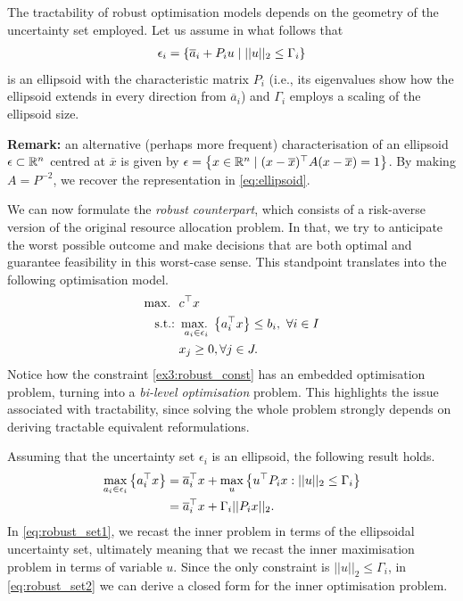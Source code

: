 The tractability of robust optimisation models depends on the geometry of the uncertainty set employed. Let us assume in what follows that 
%
\begin{align}
	\epsilon_i = \left\{ \overline{a}_i + P_iu \mid ||u||_2 \leq \Gamma_i \right \} \label{eq:ellipsoid}
\end{align}
%
is an ellipsoid with the characteristic matrix $P_i$ (i.e., its eigenvalues show how the ellipsoid extends in every direction from $\overline{a}_i$) and $\Gamma_i$ employs a scaling of the ellipsoid size.

{\bf Remark:} an alternative (perhaps more frequent) characterisation of an ellipsoid $\epsilon \subset \mathbb{R}^n$ centred at $\overline{x}$ is given by $\epsilon = \left\{ x \in \mathbb{R}^n \mid (x - \overline{x})^\top A(x - \overline{x}) = 1 \right \}$. By making $A = P^{-2}$, we recover the representation in \eqref{eq:ellipsoid}.

We can now formulate the \emph{robust counterpart}, which consists of a risk-averse version of the original resource allocation problem. In that, we try to anticipate the worst possible outcome and make decisions that are both optimal and guarantee feasibility in this worst-case sense. This standpoint translates into the following optimisation model.
%
\begin{align}
	\mathop{\text{max.~}} \ &  c^\top x \nonumber \\
	\mathop{\text{s.t.:~}} & \mathop{\text{max.~}}_{a_{i} \in \epsilon_i}\left\{ a_i^\top x \right \} \leq b_i, \ \forall i \in I \label{ex3:robust_const}\\
	& x_j \geq 0, \forall j \in J. \nonumber
\end{align}
%
Notice how the constraint \eqref{ex3:robust_const} has an embedded optimisation problem, turning into a \emph{bi-level optimisation} problem. This highlights the issue associated with tractability, since solving the whole problem strongly depends on deriving tractable equivalent reformulations.

Assuming that the uncertainty set $\epsilon_i$ is an ellipsoid, the following result holds.
%
\begin{align}
	\max_{a_{i} \in \epsilon_i}\left\{ a_i^\top x \right \}  & = \overline{a}_i^\top x + \max_u\left\{ u^\top P_i x : ||u||_2 \leq \Gamma_i \right \} \label{eq:robust_set1}\\
	& = \overline{a}_i^\top x + \Gamma_i||P_i x||_2. \label{eq:robust_set2}
\end{align}
%
In \eqref{eq:robust_set1}, we recast the inner problem in terms of the ellipsoidal uncertainty set, ultimately meaning that we recast the inner maximisation problem in terms of variable $u$. Since the only constraint is $||u||_2 \leq \Gamma_i$, in \eqref{eq:robust_set2} we can derive a closed form for the inner optimisation problem.

